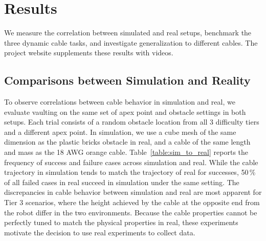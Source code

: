 \section{Results}




We measure the correlation between simulated and real setups, benchmark the three dynamic cable tasks, and investigate generalization to different cables. %
The project website supplements these results with videos.

\subsection{Comparisons between Simulation and Reality}

To observe correlations between cable behavior in simulation and real, we evaluate vaulting on the same set of apex point and obstacle settings in both setups. Each trial consists of a random obstacle location from all 3 difficulty tiers and a different apex point. In simulation, we use a cube mesh of the same dimension as the plastic bricks obstacle in real, and a cable of the same length and mass as the 18 AWG orange cable. Table~\ref{table:sim_to_real} reports the frequency of success and failure cases across simulation and real. While the cable trajectory in simulation tends to match the trajectory of real for successes, 50\,\% of all failed cases in real succeed in simulation under the same setting. The discrepancies in cable behavior between simulation and real are most apparent for Tier 3 scenarios, where the height achieved by the cable at the opposite end from the robot differ in the two environments.  Because the cable properties cannot be perfectly tuned to match the physical properties in real, these experiments motivate the decision to use real experiments to collect data.

